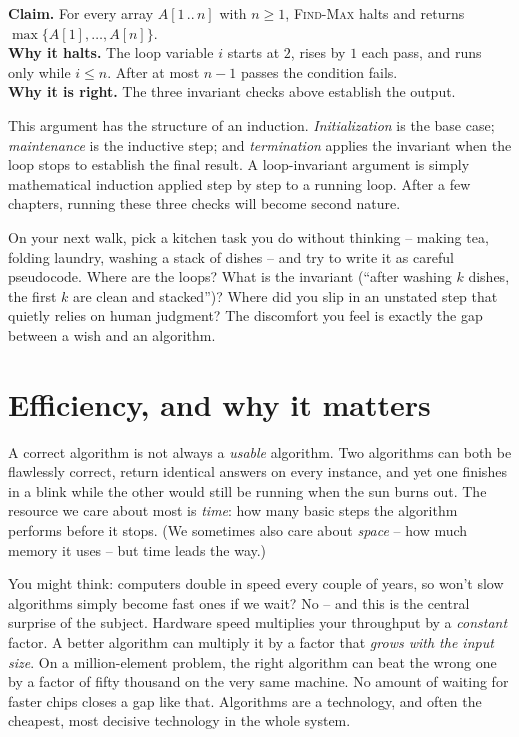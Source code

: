 \begin{formalbox}
\textbf{Claim.} For every array $A[1\,..\,n]$ with $n \ge 1$, \textsc{Find-Max}
halts and returns $\max\{A[1], \dots, A[n]\}$.\\[2pt]
\textbf{Why it halts.} The loop variable $i$ starts at $2$, rises by $1$ each
pass, and runs only while $i \le n$. After at most $n-1$ passes the
condition fails. \\
\textbf{Why it is right.} The three invariant checks above establish the output.
\end{formalbox}

This argument has the structure of an induction. \emph{Initialization} is the
base case; \emph{maintenance} is the inductive step; and \emph{termination} applies
the invariant when the loop stops to establish the final result. A loop-invariant
argument is simply mathematical induction applied step by step to a running loop.
After a few chapters, running these three checks will become second nature.

\begin{walkbox}
On your next walk, pick a kitchen task you do without thinking -- making tea,
folding laundry, washing a stack of dishes -- and try to write it as careful
pseudocode. Where are the loops? What is the invariant (``after washing $k$ dishes,
the first $k$ are clean and stacked'')? Where did you slip in an unstated step
that quietly relies on human judgment? The discomfort you feel is exactly the gap
between a wish and an algorithm.
\end{walkbox}

\section{Efficiency, and why it matters}

A correct algorithm is not always a \emph{usable} algorithm. Two algorithms can both be
flawlessly correct, return identical answers on every instance, and yet one finishes
in a blink while the other would still be running when the sun burns out. The
resource we care about most is \emph{time}: how many basic steps the algorithm
performs before it stops. (We sometimes also care about \emph{space} -- how much
memory it uses -- but time leads the way.)

\begin{aestheticbox}
You might think: computers double in speed every couple of years, so won't slow
algorithms simply become fast ones if we wait? No -- and this is the central
surprise of the subject. Hardware speed multiplies your throughput by a
\emph{constant} factor. A better algorithm can multiply it by a factor that
\emph{grows with the input size}. On a million-element problem, the right algorithm
can beat the wrong one by a factor of fifty thousand on the very same machine. No
amount of waiting for faster chips closes a gap like that. Algorithms are a
technology, and often the cheapest, most decisive technology in the whole system.
\end{aestheticbox}

